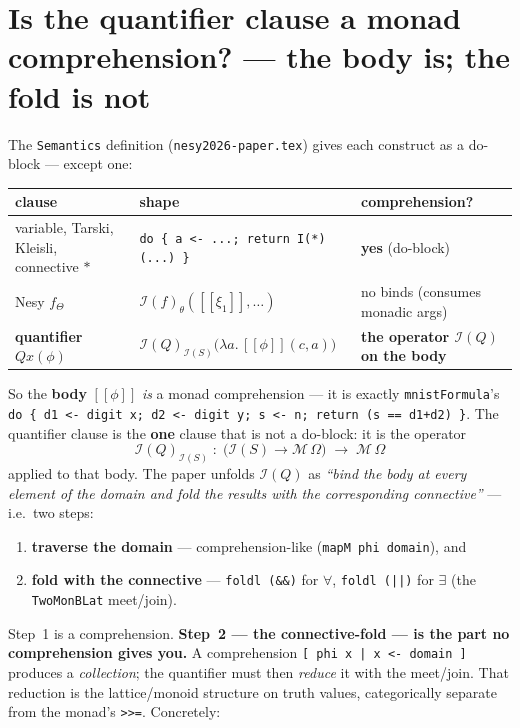 \documentclass[11pt]{article}
\newcommand{\code}[1]{\texttt{#1}}
\newcommand{\Mon}{\mathcal M}
\newcommand{\Int}{\mathcal I}
\newcommand{\sem}[1]{[\![#1]\!]}
\begin{document}
\section*{Is the quantifier clause a monad comprehension? --- the body is; the fold is not}

The \code{Semantics} definition (\code{nesy2026-paper.tex}) gives each construct as a do-block --- except
one:

\begin{center}
\begin{tabular}{@{}lll@{}}
\toprule
clause & shape & comprehension? \\
\midrule
variable, Tarski, Kleisli, connective ${*}$ & \code{do \{ a <- ...; return I(*)(...) \}} & \textbf{yes} (do-block) \\
Nesy $f_\Theta$ & $\Int(f)_\theta(\sem{\xi_1},\dots)$ & no binds (consumes monadic args) \\
\textbf{quantifier} $Qx(\phi)$ & $\Int(Q)_{\Int(S)}\bigl(\lambda a.\,\sem{\phi}(c,a)\bigr)$ & \textbf{the operator $\Int(Q)$ on the body} \\
\bottomrule
\end{tabular}
\end{center}

So the \textbf{body} $\sem{\phi}$ \emph{is} a monad comprehension --- it is exactly \code{mnistFormula}'s
\code{do \{ d1 <- digit x; d2 <- digit y; s <- n; return (s == d1+d2) \}}. The quantifier clause is the
\textbf{one} clause that is not a do-block: it is the operator
\[
  \Int(Q)_{\Int(S)} \;:\; \bigl(\Int(S) \to \Mon\,\Omega\bigr) \;\longrightarrow\; \Mon\,\Omega
\]
applied to that body. The paper unfolds $\Int(Q)$ as \emph{``bind the body at every element of the domain
and fold the results with the corresponding connective''} --- i.e.\ two steps:

\begin{enumerate}
  \item \textbf{traverse the domain} --- comprehension-like (\code{mapM phi domain}), and
  \item \textbf{fold with the connective} --- \code{foldl (\&\&)} for $\forall$, \code{foldl (||)} for
        $\exists$ (the \code{TwoMonBLat} meet/join).
\end{enumerate}

Step~1 is a comprehension. \textbf{Step~2 --- the connective-fold --- is the part no comprehension gives
you.} A comprehension \code{[ phi x | x <- domain ]} produces a \emph{collection}; the quantifier must then
\emph{reduce} it with the meet/join. That reduction is the lattice/monoid structure on truth values,
categorically separate from the monad's \code{>>=}. Concretely:
\end{document}
